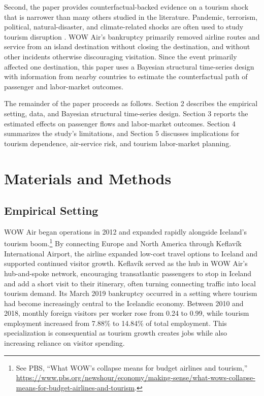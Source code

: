 \documentclass[12pt]{article}
\begin{document}
Second, the paper provides counterfactual-backed evidence on a tourism shock that is narrower than many others studied in the literature. Pandemic, terrorism, political, natural-disaster, and climate-related shocks are often used to study tourism disruption \citep{saleh_2011_do,yucel_2020_are,morakabati_2019_a,duro_2021_covid19,sun_2021_vulnerable,sun_2022_job_vulnerability,mccarroll_2024_resilience}. WOW Air's bankruptcy primarily removed airline routes and service from an island destination without closing the destination, and without other incidents otherwise discouraging visitation. Since the event primarily affected one destination, this paper uses a Bayesian structural time-series design with information from nearby countries to estimate the counterfactual path of passenger and labor-market outcomes.

The remainder of the paper proceeds as follows. Section 2 describes the empirical setting, data, and Bayesian structural time-series design. Section 3 reports the estimated effects on passenger flows and labor-market outcomes. Section 4 summarizes the study's limitations, and Section 5 discusses implications for tourism dependence, air-service risk, and tourism labor-market planning.

\section{Materials and Methods}\label{sec:methods}

\subsection{Empirical Setting}\label{sec:empirical_setting}

WOW Air began operations in 2012 and expanded rapidly alongside Iceland's tourism boom.\footnote{See PBS, ``What WOW's collapse means for budget airlines and tourism,'' \url{https://www.pbs.org/newshour/economy/making-sense/what-wows-collapse-means-for-budget-airlines-and-tourism}.} By connecting Europe and North America through Keflavík International Airport, the airline expanded low-cost travel options to Iceland and supported continued visitor growth. Keflavík served as the hub in WOW Air’s hub-and-spoke network, encouraging transatlantic passengers to stop in Iceland and add a short visit to their itinerary, often turning connecting traffic into local tourism demand. Its March 2019 bankruptcy occurred in a setting where tourism had become increasingly central to the Icelandic economy. Between 2010 and 2018, monthly foreign visitors per worker rose from 0.24 to 0.99, while tourism employment increased from 7.88\% to 14.84\% of total employment. This specialization is consequential as tourism growth creates jobs while also increasing reliance on visitor spending.
\end{document}
